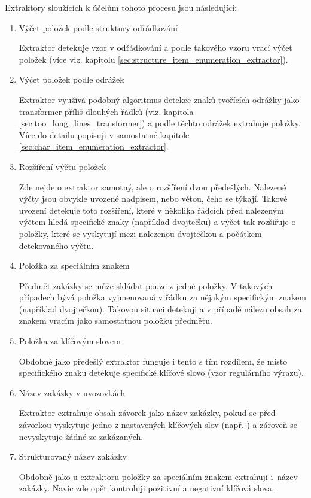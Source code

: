 \documentclass[thesis=M,czech]{FITthesis}[2019/12/23]
\begin{document}
Extraktory sloužících k účelům tohoto procesu jsou následující:
\begin{enumerate}
    \item Výčet položek podle struktury odřádkování
    
    Extraktor detekuje vzor v odřádkování a podle takového vzoru vrací výčet položek (více viz. kapitolu \ref{sec:structure_item_enumeration_extractor}).
    
    \item Výčet položek podle odrážek
    
    Extraktor využívá podobný algoritmus detekce znaků tvořících odrážky jako transformer příliš dlouhých řádků (viz. kapitola \ref{sec:too_long_lines_transformer}) a podle těchto odrážek extrahuje položky. Více do detailu popisuji v samostatné kapitole \ref{sec:char_item_enumeration_extractor}.
    
    \item Rozšíření výčtu položek
    
    Zde nejde o extraktor samotný, ale o rozšíření dvou předešlých. Nalezené výčty jsou obvykle uvozené nadpisem, nebo větou, čeho se týkají. Takové uvození detekuje toto rozšíření, které v několika řádcích před nalezeným výčtem hledá specifické znaky (například dvojtečku) a výčet tak rozšiřuje o položky, které se vyskytují mezi nalezenou dvojtečkou a počátkem detekovaného výčtu.
    
    \item Položka za speciálním znakem
    
    Předmět zakázky se může skládat pouze z jedné položky. V takových případech bývá položka vyjmenovaná v řádku za nějakým specifickým znakem (například dvojtečkou). Takovou situaci detekuji a v případě nálezu obsah za znakem vracím jako samostatnou položku předmětu.
    
    \item Položka za klíčovým slovem
    
    Obdobně jako předešlý extraktor funguje i tento s tím rozdílem, že místo specifického znaku detekuje specifické klíčové slovo (vzor regulárního výrazu).
    
    \item Název zakázky v uvozovkách
    
    Extraktor extrahuje obsah závorek jako název zakázky, pokud se před závorkou vyskytuje jedno z nastavených klíčových slov (např. ) a zároveň se nevyskytuje žádné ze zakázaných.
    
    \item Strukturovaný název zakázky
    
    Obdobně jako u extraktoru položky za speciálním znakem extrahuji i~název zakázky. Navíc zde opět kontroluji pozitivní a negativní klíčová slova.
\end{enumerate}
\end{document}
